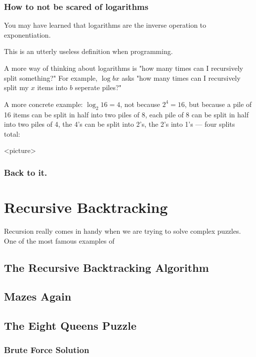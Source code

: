 \documentclass[10pt,a4paper]{book}
\begin{document}
\subsubsection{How to not be scared of logarithms }
You may have learned that logarithms are the inverse operation to exponentiation.


This is an utterly useless definition when programming.


A more way of thinking about logarithms is "how many times can I recursively split something?"
For example, $\log b x$ asks "how many times can I recursively split my $x$ items into $b$ seperate piles?"

A more concrete example: $\log_2 16 = 4$, not because $2^4 = 16$, but because a pile of 16 items can be split in half into two piles of 8, each pile of 8 can be split in half into two piles of 4, the 4's can be split into 2's, the 2's into 1's --- four splits total:

<picture>

\subsubsection{Back to it.}

\section{Recursive Backtracking}
Recursion really comes in handy when we are trying to solve complex puzzles.
One of the most famous examples of 

\subsection*{The Recursive Backtracking Algorithm}


\subsection{Mazes Again}



\subsection{The Eight Queens Puzzle}

\subsubsection{Brute Force Solution}
\end{document}
